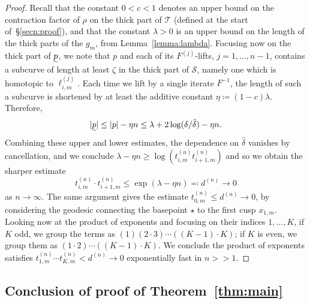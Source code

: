 \documentclass{amsart}
\theoremstyle{definition}
\theoremstyle{remark}
\newcommand{\cT}{\mathcal{T}}
\newcommand{\cS}{\mathcal{S}}
\renewcommand\gg{>\!\!>}
\begin{document}
\begin{proof}
Recall that the constant $0<c<1$ denotes an upper bound on the contraction factor of $\rho$ on the thick part of $\cT$ (defined at the start of~\S\ref{secn:proof}), and that the constant $\lambda > 0$ is an upper bound on the length of the thick parts of the $g_m$, from Lemma~\ref{lemma:lambda}.  Focusing now on the thick part of $\undertilde{p}$, we note that $p$ and each of its $F^{(j)}$-lifts, $j=1, \ldots, n-1$, contains a subcurve of length at least $\zeta$ in the thick part of $\cS$, namely one which is homotopic to $\ell_{i,m}^{(j)}$.  Each time we lift by a single iterate $F^{-1}$, the length of such a subcurve is shortened by at least the additive constant $\eta\coloneqq(1-c)\lambda$. Therefore,
  \[|\undertilde{p}|\le|p|-\eta n \le \lambda+2\log(\delta/\hat{\delta})-\eta n.\]
Combining these upper and lower estimates, the dependence on $\hat{\delta}$ vanishes by cancellation, and we conclude $\lambda-\eta n\ge\log(t^{(n)}_{i,m}t^{(n)}_{i+1,m})$ and so we obtain the sharper estimate
  \[t^{(n)}_{i,m}\cdot t^{(n)}_{i+1,m}\le\exp(\lambda-\eta n)\eqqcolon d^{(n)}\to 0\]
  as $n\to\infty$. The same argument gives the estimate $t^{(n)}_{0,m} \leq d^{(n)}\to 0$, by considering the geodesic connecting the basepoint $\star$ to the first cusp $x_{1,m}$.  Looking now at the product of exponents and focusing on their indices $1, \ldots, K$, if $K$ odd, we group the terms as $(1)(2\cdot 3)\cdots ((K-1)\cdot K)$; if $K$ is even, we group them as $(1\cdot 2)\cdots ((K-1)\cdot K)$. We conclude the product of exponents satisfies $t^{(n)}_{1,m}\cdots t^{(n)}_{K,m} < d^{(n)}\to 0$ exponentially fast in $n \gg 1$.
\end{proof}

\subsection{Conclusion of proof of Theorem~\ref{thm:main}}
\label{subsecn:conclusion}
\end{document}
